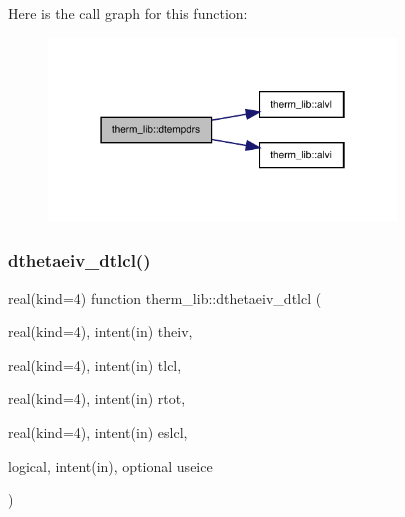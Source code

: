 Here is the call graph for this function\+:
\nopagebreak
\begin{figure}[H]
\begin{center}
\leavevmode
\includegraphics[width=262pt]{namespacetherm__lib_a98f9f548762461093dfbe7604fcc5601_cgraph}
\end{center}
\end{figure}
\mbox{\label{namespacetherm__lib_a46f478124e2b8b34a4f64e13df4a9713}} 
\subsubsection{\texorpdfstring{dthetaeiv\+\_\+dtlcl()}{dthetaeiv\_dtlcl()}}
{\footnotesize\ttfamily real(kind=4) function therm\+\_\+lib\+::dthetaeiv\+\_\+dtlcl (\begin{DoxyParamCaption}\item[{real(kind=4), intent(in)}]{theiv,  }\item[{real(kind=4), intent(in)}]{tlcl,  }\item[{real(kind=4), intent(in)}]{rtot,  }\item[{real(kind=4), intent(in)}]{eslcl,  }\item[{logical, intent(in), optional}]{useice }\end{DoxyParamCaption})}

